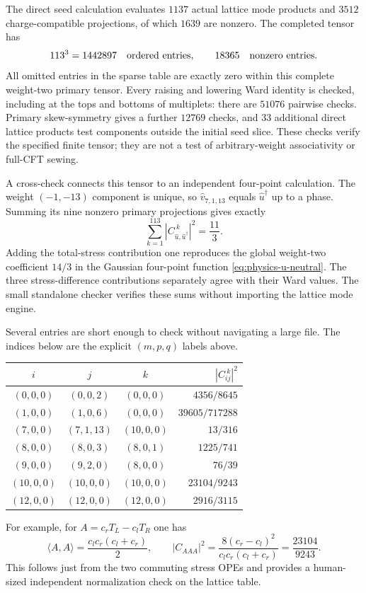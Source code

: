 The direct seed calculation evaluates $1137$ actual lattice mode
products and $3512$ charge-compatible projections, of which $1639$
are nonzero. The completed tensor has
\[
 113^3=1442897\quad\hbox{ordered entries},\qquad
 18365\quad\hbox{nonzero entries}.
\]
All omitted entries in the sparse table are exactly zero within this
complete weight-two primary tensor. Every raising and lowering Ward
identity is checked, including at the tops and bottoms of multiplets:
there are $51076$ pairwise checks. Primary skew-symmetry gives a
further $12769$ checks, and $33$ additional direct lattice products
test components outside the initial seed slice. These checks verify
the specified finite tensor; they are not a test of arbitrary-weight
associativity or full-CFT sewing.

A cross-check connects this tensor to an independent four-point
calculation. The weight $(-1,-13)$ component is unique, so
$\widehat v_{7,1,13}$ equals $\widehat u^\dagger$ up to a phase.
Summing its nine nonzero primary projections gives exactly
\[
 \sum_{k=1}^{113}|C_{\widehat u,\widehat u^\dagger}^{\ k}|^2
 =\frac{11}{3}.
\]
Adding the total-stress contribution one reproduces the global
weight-two coefficient $14/3$ in the Gaussian four-point function
\eqref{eq:physics-u-neutral}. The three stress-difference contributions
separately agree with their Ward values. The small standalone checker
 verifies these sums without
importing the lattice mode engine.

Several entries are short enough to check without navigating a large
file. The indices below are the explicit $(m,p,q)$ labels above.
\begin{center}
\begin{tabular}{ccc|r}
\toprule
$i$&$j$&$k$&$|C_{ij}^{\ k}|^2$\\
\midrule
$(0,0,0)$&$(0,0,2)$&$(0,0,0)$&$4356/8645$\\
$(1,0,0)$&$(1,0,6)$&$(0,0,0)$&$39605/717288$\\
$(7,0,0)$&$(7,1,13)$&$(10,0,0)$&$13/316$\\
$(8,0,0)$&$(8,0,3)$&$(8,0,1)$&$1225/741$\\
$(9,0,0)$&$(9,2,0)$&$(8,0,0)$&$76/39$\\
$(10,0,0)$&$(10,0,0)$&$(10,0,0)$&$23104/9243$\\
$(12,0,0)$&$(12,0,0)$&$(12,0,0)$&$2916/3115$\\
\bottomrule
\end{tabular}
\end{center}
For example, for $A=c_rT_L-c_lT_R$ one has
\[
 \langle A,A\rangle=\frac{c_lc_r(c_l+c_r)}2,\qquad
 |C_{AAA}|^2=\frac{8(c_r-c_l)^2}{c_lc_r(c_l+c_r)}
 =\frac{23104}{9243}.
\]
This follows just from the two commuting stress OPEs and provides a
human-sized independent normalization check on the lattice table.

